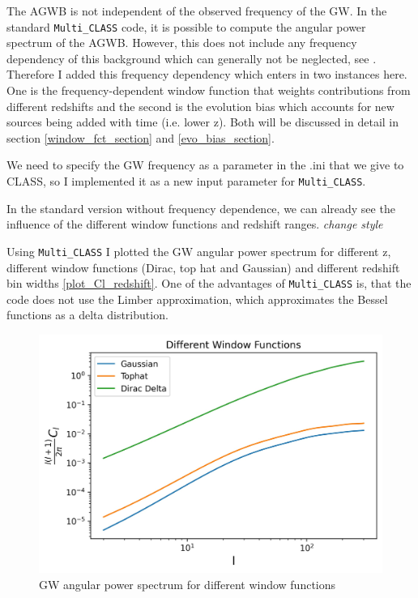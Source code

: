 The AGWB is not independent of the observed frequency of the GW. In the standard 
{\tt Multi\_CLASS} code, it is possible to compute the angular power spectrum of the AGWB. However, this does not include any frequency dependency of this background which can generally not be neglected, see \cite{dallarmi_dipole_2022}. Therefore I added this frequency dependency which enters in two instances here. One is the frequency-dependent window function that weights contributions from different redshifts and the second is the evolution bias which accounts for new sources being added with time (i.e. lower z). Both will be discussed in detail in section \ref{window_fct_section} and \ref{evo_bias_section}.

We need to specify the GW frequency as a parameter in the .ini that we give to CLASS,
so I implemented it as a new input parameter for {\tt Multi\_CLASS}.

In the standard version without frequency dependence, we can already see the influence of the different window functions and redshift ranges.
\textit{change style}

Using {\tt Multi\_CLASS} \cite{bellomo_beware_2020} I plotted the GW angular power spectrum for different z, 
different window functions (Dirac, top hat and Gaussian) and different redshift bin 
widths \ref{plot_Cl_redshift}. One of the advantages of {\tt Multi\_CLASS} is, that the 
code does not use the Limber approximation, which approximates the Bessel functions 
as a delta distribution. 
\\
\begin{figure}[h]
 \centering
 \includegraphics[width=0.7\linewidth]{Images/GW_autocorr_window-fct.jpg}
 \caption{GW angular power spectrum for different window functions}
 \label{plot_Cl_window_fct}
\end{figure} 

